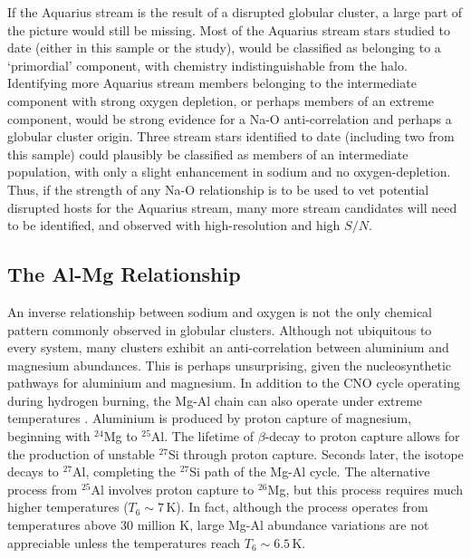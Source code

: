 \documentclass{emulateapj}
\begin{document}
If the Aquarius stream is the result of a disrupted globular cluster, a large part of the picture would still be missing. Most of the Aquarius stream stars studied to date (either in this sample or the \citet{wylie-de-boer;et-al_2012} study), would be classified as belonging to a `primordial' component, with chemistry indistinguishable from the halo. Identifying more Aquarius stream members belonging to the intermediate component with strong oxygen depletion, or perhaps members of an extreme component, would be strong evidence for a Na-O anti-correlation and perhaps a globular cluster origin. Three stream stars identified to date (including two from this sample) could plausibly be classified as members of an intermediate population, with only a slight enhancement in sodium and no oxygen-depletion. Thus, if the strength of any Na-O relationship is to be used to vet potential disrupted hosts for the Aquarius stream, many more stream candidates will need to be identified, and observed with high-resolution and high $S/N$.

\subsection{The Al-Mg Relationship}


An inverse relationship between sodium and oxygen is not the only chemical pattern commonly observed in globular clusters. Although not ubiquitous to every system, many clusters exhibit an anti-correlation between aluminium and magnesium abundances. This is perhaps unsurprising, given the nucleosynthetic pathways for aluminium and magnesium. In addition to the CNO cycle operating during hydrogen burning, the Mg-Al chain can also operate under extreme temperatures \citep[$T_6 \sim 3$\,K][]{arnould;et-al_1999}. Aluminium is produced by proton capture of magnesium, beginning with $^{24}$Mg to $^{25}$Al. The lifetime of $\beta$-decay to proton capture allows for the production of unstable $^{27}$Si through proton capture. Seconds later, the isotope decays to $^{27}$Al, completing the $^{27}$Si path of the Mg-Al cycle. The alternative process from $^{25}$Al involves proton capture to $^{26}$Mg, but this process requires much higher temperatures ($T_6 \sim 7$\,K). In fact, although the process operates from temperatures above 30 million K, large Mg-Al abundance variations are not appreciable unless the temperatures reach $T_6 \sim 6.5$\,K. 
\end{document}
